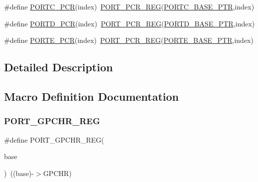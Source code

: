 \begin{DoxyCompactItemize}
\item 
\#define \hyperlink{group___p_o_r_t___register___accessor___macros_ga75241e82a338f32753a385c88421a30e}{P\+O\+R\+T\+C\+\_\+\+P\+CR}(index)~\hyperlink{group___p_o_r_t___register___accessor___macros_ga7a4a549c0ffd6b98b9fbfc0bdcfb5cea}{P\+O\+R\+T\+\_\+\+P\+C\+R\+\_\+\+R\+EG}(\hyperlink{group___p_o_r_t___peripheral_ga03c740cdda17711afafc932723871474}{P\+O\+R\+T\+C\+\_\+\+B\+A\+S\+E\+\_\+\+P\+TR},index)
\item 
\#define \hyperlink{group___p_o_r_t___register___accessor___macros_gaf8baf1fbb9a157629a0482476cd07a68}{P\+O\+R\+T\+D\+\_\+\+P\+CR}(index)~\hyperlink{group___p_o_r_t___register___accessor___macros_ga7a4a549c0ffd6b98b9fbfc0bdcfb5cea}{P\+O\+R\+T\+\_\+\+P\+C\+R\+\_\+\+R\+EG}(\hyperlink{group___p_o_r_t___peripheral_ga7f5a263751543810ebfdbde278383276}{P\+O\+R\+T\+D\+\_\+\+B\+A\+S\+E\+\_\+\+P\+TR},index)
\item 
\#define \hyperlink{group___p_o_r_t___register___accessor___macros_gaf631c8cdff059152b15250d1fe08862c}{P\+O\+R\+T\+E\+\_\+\+P\+CR}(index)~\hyperlink{group___p_o_r_t___register___accessor___macros_ga7a4a549c0ffd6b98b9fbfc0bdcfb5cea}{P\+O\+R\+T\+\_\+\+P\+C\+R\+\_\+\+R\+EG}(\hyperlink{group___p_o_r_t___peripheral_gab166fe285bbb15b52de610f408fe25d3}{P\+O\+R\+T\+E\+\_\+\+B\+A\+S\+E\+\_\+\+P\+TR},index)
\end{DoxyCompactItemize}


\subsection{Detailed Description}


\subsection{Macro Definition Documentation}
\mbox{\label{group___p_o_r_t___register___accessor___macros_ga5b60d88d1233de175d8e51c5b65b3ff0}} 
\subsubsection{\texorpdfstring{P\+O\+R\+T\+\_\+\+G\+P\+C\+H\+R\+\_\+\+R\+EG}{PORT\_GPCHR\_REG}}
{\footnotesize\ttfamily \#define P\+O\+R\+T\+\_\+\+G\+P\+C\+H\+R\+\_\+\+R\+EG(\begin{DoxyParamCaption}\item[{}]{base }\end{DoxyParamCaption})~((base)-\/$>$G\+P\+C\+HR)}

